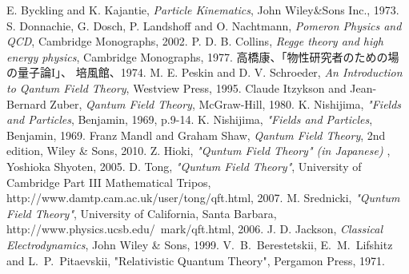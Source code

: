 \documentclass[12pt]{article}
\begin{document}
\newpage
\begin{thebibliography}{9}
 E. Byckling and K. Kajantie,  {\it Particle Kinematics}, John Wiley\&Sons Inc., 1973.
 S. Donnachie, G. Dosch, P. Landshoff and O. Nachtmann, 
	{\it Pomeron Physics and QCD}, Cambridge Monographs, 2002.
 P. D. B. Collins,
	{\it Regge theory and high energy physics}, Cambridge Monographs, 1977.
 高橋康、「物性研究者のための場の量子論I」、
	培風館、1974.
 M. E. Peskin and D. V. Schroeder,
	{\it An Introduction to Qantum Field Theory}, Westview Press, 1995.
 Claude Itzykson and Jean-Bernard Zuber,
	{\it Qantum Field Theory}, McGraw-Hill, 1980.
 K. Nishijima, {\it "Fields and Particles}, Benjamin, 1969, p.9-14.
 K. Nishijima, {\it "Fields and Particles}, Benjamin, 1969.
 Franz Mandl and Graham Shaw,
	{\it Qantum Field Theory}, 2nd edition, Wiley \& Sons, 2010.
 Z. Hioki, {\it "Quntum Field Theory" (in Japanese) }, Yoshioka Shyoten, 2005.
 D. Tong, {\it "Quntum Field Theory"}, University of Cambridge Part III Mathematical Tripos,
http://www.damtp.cam.ac.uk/user/tong/qft.html, 2007.
 M. Srednicki, {\it "Quntum Field Theory"}, University of California, Santa Barbara,
http://www.physics.ucsb.edu/~mark/qft.html, 2006.
 J. D. Jackson,
	{\it Classical Electrodynamics}, John Wiley \& Sons, 1999.
 V.~B.~Berestetskii, E.~M.~Lifshitz and L.~P.~Pitaevskii,
"Relativistic Quantum Theory", Pergamon Press, 1971.
\end{thebibliography}
\end{document}
